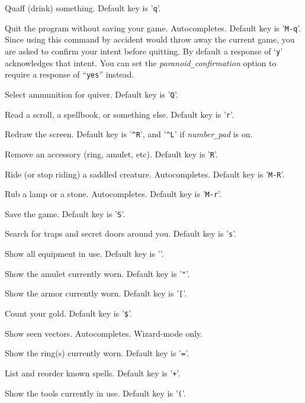 \item[\tb{\#quaff}]
Quaff (drink) something. Default key is '{\tt q}'.
\item[\tb{\#quit}]
Quit the program without saving your game. Autocompletes.
Default key is '{\tt M-q}'.
Since using this command by accident would throw away the current game,
you are asked to confirm your intent before quitting.  By default a
response of `{\tt y}' acknowledges that intent.  You can set the
{\it paranoid\verb+_+confirmation\/}
option to require a response of ``{\tt yes}'' instead.
\item[\tb{\#quiver}]
Select ammunition for quiver. Default key is '{\tt Q}'.
\item[\tb{\#read}]
Read a scroll, a spellbook, or something else. Default key is '{\tt r}'.
\item[\tb{\#redraw}]
Redraw the screen. Default key is '{\tt \^{}R}', and '{\tt \^{}L}' if {\it number\verb+_+pad\/} is on.
\item[\tb{\#remove}]
Remove an accessory (ring, amulet, etc). Default key is '{\tt R}'.
\item[\tb{\#ride}]
Ride (or stop riding) a saddled creature. Autocompletes.
Default key is '{\tt M-R}'.
\item[\tb{\#rub}]
Rub a lamp or a stone. Autocompletes. Default key is '{\tt M-r}'.
\item[\tb{\#save}]
Save the game. Default key is '{\tt S}'.
\item[\tb{\#search}]
Search for traps and secret doors around you. Default key is '{\tt s}'.
\item[\tb{\#seeall}]
Show all equipment in use. Default key is '{\tt *}'.
\item[\tb{\#seeamulet}]
Show the amulet currently worn. Default key is '{\tt "}'.
\item[\tb{\#seearmor}]
Show the armor currently worn. Default key is '{\tt [}'.
\item[\tb{\#seegold}]
Count your gold. Default key is '{\tt \$}'.
\item[\tb{\#seenv}]
Show seen vectors. Autocompletes. Wizard-mode only.
\item[\tb{\#seerings}]
Show the ring(s) currently worn. Default key is '{\tt =}'.
\item[\tb{\#seespells}]
List and reorder known spells. Default key is '{\tt +}'.
\item[\tb{\#seetools}]
Show the tools currently in use. Default key is '{\tt (}'.
